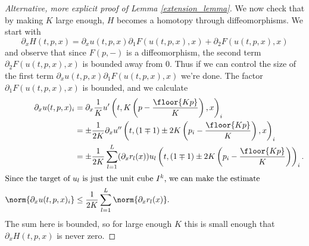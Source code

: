 \begin{proof}[Alternative, more explicit proof of Lemma \ref{extension_lemma}]
We now check that by making $K$ large enough, $H$ becomes a homotopy through diffeomorphisms. We start with
$$\partial_x H(t,p,x) = \partial_x u(t,p,x) \partial_1 F(u(t,p,x), x) + \partial_2 F(u(t,p,x), x)$$
and observe that since $F(p, -)$ is a diffeomorphism, the second term $\partial_2 F(u(t,p,x), x)$ is bounded away from $0$. Thus if we can control the
size of the first term $\partial_x u(t,p,x) \partial_1 F(u(t,p,x), x)$ we're done. The factor $\partial_1 F(u(t,p,x), x)$ is bounded, and we
calculate 
\begin{align*}
\partial_x u(t,p,x)_i & = \partial_x \frac{1}{K} u'\left(t, K\left(p - \frac{\floor{K p}}{K}\right), x\right)_i \\
                      & = \pm \frac{1}{2 K} \partial_x u''\left(t, (1\mp1)\pm 2K\left(p_i-\frac{\floor{K p}}{K}\right), x\right)_i \\
                      & = \pm \frac{1}{2 K} \sum_{l=1}^L (\partial_x r_l(x)) u_l\left(t, (1\mp1)\pm 2K\left(p_i-\frac{\floor{K p}}{K}\right)\right)_i. \\
\intertext{Since the target of $u_l$ is just the unit cube $I^k$, we can make the estimate}
\norm{\partial_x u(t,p,x)_i} & \leq \frac{1}{2 K} \sum_{l=1}^L \norm{\partial_x r_l(x)}.
\end{align*}
The sum here is bounded, so for large enough $K$ this is small enough that $\partial_x H(t,p,x)$ is never zero.

\end{proof}